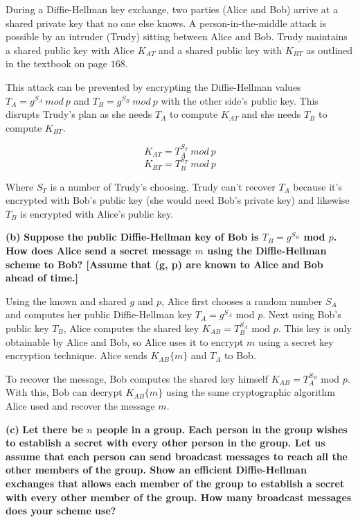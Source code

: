 \documentclass[11pt]{article}
\renewcommand\part[1]{\vspace{.10in}\textbf{(#1)}}
\begin{document}
During a Diffie-Hellman key exchange, two parties (Alice and Bob) arrive at a shared private key that no one else knows. A person-in-the-middle attack is possible by an intruder (Trudy) sitting between Alice and Bob. Trudy maintains a shared public key with Alice $K_{AT}$ and a shared public key with $K_{BT}$ as outlined in the textbook on page $168$.

This attack can be prevented by encrypting the Diffie-Hellman values $T_A = g^{S_A} \ mod \ p$ and $T_B = g^{S_B} \ mod \ p$ with the other side's public key. This disrupts Trudy's plan as she needs $T_A$ to compute $K_{AT}$ and she needs $T_B$ to compute $K_{BT}$.

$$K_{AT} = T_A^{S_T} \ mod \ p$$
$$K_{BT} = T_B^{S_T} \ mod \ p$$

Where $S_T$ is a number of Trudy's choosing. Trudy can't recover $T_A$ because it's encrypted with Bob's public key (she would need Bob's private key) and likewise $T_B$ is encrypted with Alice's public key.

\part{b} \textbf{Suppose the public Diffie-Hellman key of Bob is $T_B = g^{S_B}$ mod $p$. How does Alice send a secret message $m$ using the Diffie-Hellman scheme to Bob? [Assume that (g, p) are known to Alice and Bob ahead of time.]}

Using the known and shared $g$ and $p$, Alice first chooses a random number $S_A$ and computes her public Diffie-Hellman key $T_A = g^{S_A}$ mod $p$. Next using Bob's public key $T_B$, Alice computes the shared key $K_{AB} = T_B^{S_A}$ mod $p$. This key is only obtainable by Alice and Bob, so Alice uses it to encrypt $m$ using a secret key encryption technique. Alice sends $K_{AB}\{m\}$ and $T_A$ to Bob.

To recover the message, Bob computes the shared key himself $K_{AB} = T_A^{S_B}$ mod $p$. With this, Bob can decrypt $K_{AB}\{m\}$ using the same cryptographic algorithm Alice used and recover the message $m$.

\part{c} \textbf{Let there be $n$ people in a group. Each person in the group wishes to establish a secret with every other person in the group. Let us assume that each person can send broadcast messages to reach all the other members of the group. Show an efficient Diffie-Hellman exchanges that allows each member of the group to establish a secret with every other member of the group. How many broadcast messages does your scheme use?}
\end{document}
